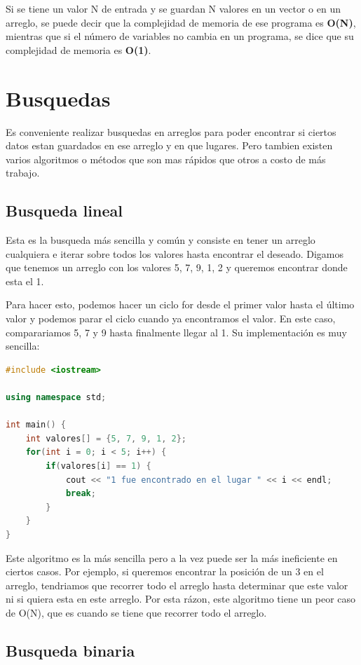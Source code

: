 \documentclass{article}
\begin{document}
Si se tiene un valor N de entrada y se guardan N valores en un vector o en un arreglo, se puede decir que la complejidad de memoria de ese programa es \textbf{O(N)}, mientras que si el número de variables no cambia en un programa, se dice que su complejidad de memoria es \textbf{O(1)}.

\section{Busquedas}

Es conveniente realizar busquedas en arreglos para poder encontrar si ciertos datos estan guardados en ese arreglo y en que lugares. Pero tambien existen varios algoritmos o métodos que son mas rápidos que otros a costo de más trabajo.

\subsection{Busqueda lineal}

Esta es la busqueda más sencilla y común y consiste en tener un arreglo cualquiera e iterar sobre todos los valores hasta encontrar el deseado. Digamos que tenemos un arreglo con los valores 5, 7, 9, 1, 2 y queremos encontrar donde esta el 1.

Para hacer esto, podemos hacer un ciclo for desde el primer valor hasta el último valor y podemos parar el ciclo cuando ya encontramos el valor. En este caso, comparariamos 5, 7 y 9 hasta finalmente llegar al 1. Su implementación es muy sencilla:

\begin{lstlisting}[language=C++, title=Busqueda lineal]
#include <iostream>

using namespace std;

int main() {
	int valores[] = {5, 7, 9, 1, 2};
	for(int i = 0; i < 5; i++) {
		if(valores[i] == 1) {
			cout << "1 fue encontrado en el lugar " << i << endl;
			break;
		}
	}
}
\end{lstlisting}

Este algoritmo es la más sencilla pero a la vez puede ser la más ineficiente en ciertos casos. Por ejemplo, si queremos encontrar la posición de un 3 en el arreglo, tendriamos que recorrer todo el arreglo hasta determinar que este valor ni si quiera esta en este arreglo. Por esta rázon, este algoritmo tiene un peor caso de O(N), que es cuando se tiene que recorrer todo el arreglo.

\subsection{Busqueda binaria}
\end{document}
